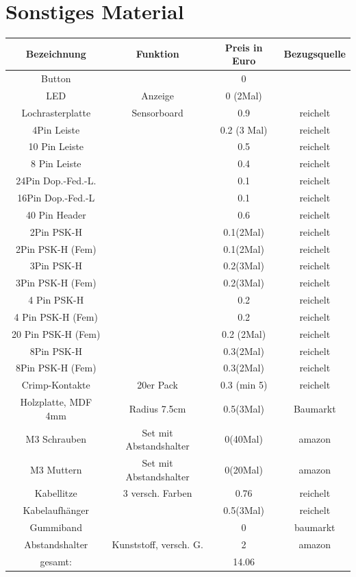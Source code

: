 \documentclass[twoside,11pt, a4paper]{report}
\begin{document}
	\section{Sonstiges Material}
	\begin{center}
		\begin{tabular}{|c|c|c|c|}
			\hline
			Bezeichnung			&Funktion				& Preis	in Euro			&Bezugsquelle\\
			\hline
			Button				&						& 0				& 		\\
			LED					&Anzeige				& 0 (2Mal)		&		\\
			Lochrasterplatte	&Sensorboard			& 0.9			& reichelt		\\
			4Pin Leiste			& 						& 0.2 (3 Mal)	& reichelt		\\
			10 Pin Leiste		&						& 0.5			& reichelt		\\
			8 Pin Leiste		&						& 0.4			& reichelt		\\
			24Pin Dop.-Fed.-L.	&						& 0.1			& reichelt		\\
			16Pin Dop.-Fed.-L	&						& 0.1			& reichelt		\\
			40 Pin Header		&						& 0.6			& reichelt		\\
			2Pin PSK-H			&						& 0.1(2Mal)		& reichelt	\\
			2Pin PSK-H (Fem)	&						& 0.1(2Mal)		& reichelt	\\
			3Pin PSK-H			&						& 0.2(3Mal)		& reichelt		\\
			3Pin PSK-H (Fem)	&						& 0.2(3Mal)		& reichelt		\\
			4 Pin PSK-H			&						& 0.2			& reichelt\\
			4 Pin PSK-H	(Fem)	&						& 0.2			& reichelt\\
			20 Pin PSK-H	(Fem)&						& 0.2 (2Mal)	& reichelt\\
			8Pin PSK-H			&						& 0.3(2Mal)		& reichelt\\
			8Pin PSK-H (Fem)	&						& 0.3(2Mal)		& reichelt\\
			Crimp-Kontakte		& 20er Pack				& 0.3 (min 5)	& reichelt\\
			Holzplatte, MDF 4mm	& Radius 7.5cm			& 0.5(3Mal)		& Baumarkt		\\
			M3 Schrauben		& Set mit Abstandshalter& 0(40Mal)		& amazon		\\
			M3 Muttern			& Set mit Abstandshalter& 0(20Mal)		& amazon		\\
			Kabellitze			& 3 versch. Farben		& 0.76			& reichelt		\\
			Kabelaufhänger		&						& 0.5(3Mal)		& reichelt		\\
			Gummiband			&						& 0				& baumarkt\\
			Abstandshalter 		& Kunststoff, versch. G.& 2				& amazon		\\
			\hline
			gesamt: 			&						&14.06			&\\
			\hline
		\end{tabular}
	\end{center}
	
\end{document}
